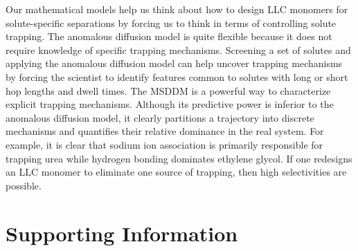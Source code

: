 \documentclass{article}
\begin{document}
  Our mathematical models help us think about how to design LLC monomers for 
  solute-specific separations by forcing us to think in terms of controlling 
  solute trapping. The anomalous diffusion model is quite flexible because it
  does not require knowledge of specific trapping mechanisms. Screening a set
  of solutes and applying the anomalous diffusion model can help uncover
  trapping mechanisms by forcing the scientist to identify features common 
  to solutes with long or short hop lengths and dwell times. The MSDDM is a 
  powerful way to characterize explicit trapping mechanisms. Although its
  predictive power is inferior to the anomalous diffusion model, it clearly
  partitions a trajectory into discrete mechanisms and quantifies their
  relative dominance in the real system. For example, it is clear that 
  sodium ion association is primarily responsible for trapping urea while 
  hydrogen bonding dominates ethylene glycol. If one redesigns an LLC monomer
  to eliminate one source of trapping, 
  then high selectivities are possible.
  
%  
%  
%
%  
  
  
  \section*{Supporting Information}
\end{document}
